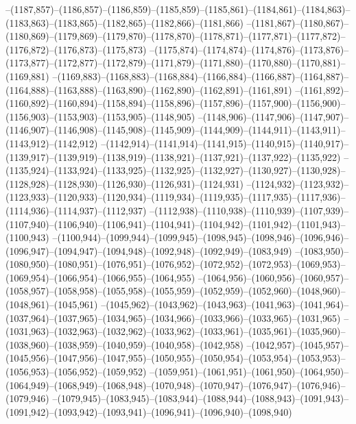 --(1187,857)--(1186,857)--(1186,859)--(1185,859)--(1185,861)--(1184,861)--(1184,863)--(1183,863)--(1183,865)--(1182,865)--(1182,866)--(1181,866)
--(1181,867)--(1180,867)--(1180,869)--(1179,869)--(1179,870)--(1178,870)--(1178,871)--(1177,871)--(1177,872)--(1176,872)--(1176,873)--(1175,873)
--(1175,874)--(1174,874)--(1174,876)--(1173,876)--(1173,877)--(1172,877)--(1172,879)--(1171,879)--(1171,880)--(1170,880)--(1170,881)--(1169,881)
--(1169,883)--(1168,883)--(1168,884)--(1166,884)--(1166,887)--(1164,887)--(1164,888)--(1163,888)--(1163,890)--(1162,890)--(1162,891)--(1161,891)
--(1161,892)--(1160,892)--(1160,894)--(1158,894)--(1158,896)--(1157,896)--(1157,900)--(1156,900)--(1156,903)--(1153,903)--(1153,905)--(1148,905)
--(1148,906)--(1147,906)--(1147,907)--(1146,907)--(1146,908)--(1145,908)--(1145,909)--(1144,909)--(1144,911)--(1143,911)--(1143,912)--(1142,912)
--(1142,914)--(1141,914)--(1141,915)--(1140,915)--(1140,917)--(1139,917)--(1139,919)--(1138,919)--(1138,921)--(1137,921)--(1137,922)--(1135,922)
--(1135,924)--(1133,924)--(1133,925)--(1132,925)--(1132,927)--(1130,927)--(1130,928)--(1128,928)--(1128,930)--(1126,930)--(1126,931)--(1124,931)
--(1124,932)--(1123,932)--(1123,933)--(1120,933)--(1120,934)--(1119,934)--(1119,935)--(1117,935)--(1117,936)--(1114,936)--(1114,937)--(1112,937)
--(1112,938)--(1110,938)--(1110,939)--(1107,939)--(1107,940)--(1106,940)--(1106,941)--(1104,941)--(1104,942)--(1101,942)--(1101,943)--(1100,943)
--(1100,944)--(1099,944)--(1099,945)--(1098,945)--(1098,946)--(1096,946)--(1096,947)--(1094,947)--(1094,948)--(1092,948)--(1092,949)--(1083,949)
--(1083,950)--(1080,950)--(1080,951)--(1076,951)--(1076,952)--(1072,952)--(1072,953)--(1069,953)--(1069,954)--(1066,954)--(1066,955)--(1064,955)
--(1064,956)--(1060,956)--(1060,957)--(1058,957)--(1058,958)--(1055,958)--(1055,959)--(1052,959)--(1052,960)--(1048,960)--(1048,961)--(1045,961)
--(1045,962)--(1043,962)--(1043,963)--(1041,963)--(1041,964)--(1037,964)--(1037,965)--(1034,965)--(1034,966)--(1033,966)--(1033,965)--(1031,965)
--(1031,963)--(1032,963)--(1032,962)--(1033,962)--(1033,961)--(1035,961)--(1035,960)--(1038,960)--(1038,959)--(1040,959)--(1040,958)--(1042,958)
--(1042,957)--(1045,957)--(1045,956)--(1047,956)--(1047,955)--(1050,955)--(1050,954)--(1053,954)--(1053,953)--(1056,953)--(1056,952)--(1059,952)
--(1059,951)--(1061,951)--(1061,950)--(1064,950)--(1064,949)--(1068,949)--(1068,948)--(1070,948)--(1070,947)--(1076,947)--(1076,946)--(1079,946)
--(1079,945)--(1083,945)--(1083,944)--(1088,944)--(1088,943)--(1091,943)--(1091,942)--(1093,942)--(1093,941)--(1096,941)--(1096,940)--(1098,940)
